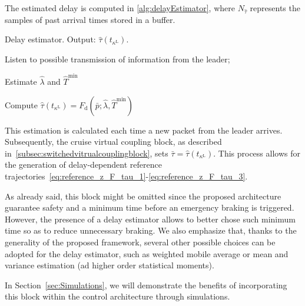 \documentclass[letterpaper, 10 pt, conference]{ieeeconf}
\theoremstyle{definition}
\theoremstyle{nopoint}
\newcommand{\tildeAdd}{~}
\begin{document}
The estimated delay is computed in \ref{alg:delayEstimator}, where $N_{\hat{\tau}}$ represents the samples of past arrival times stored in a buffer.

\begin{algorithm}
	\caption{Delay estimator. Output: $\hat{\tau}(t_{\kappa^\mathrm{L}})$. }\label{alg:delayEstimator}
	\begin{algorithmic}[1]
		\Loop
		
		\State Listen to possible transmission of information from the leader;
		
		
		\State Estimate $\hat{\lambda}$ and $\hat{T}^\mathrm{min}$
		
		\State Compute $\hat{\tau}(t_{\kappa^\mathrm{L}}) = F_{\mathrm{d}} (\bar{p}; \hat{\lambda}, \hat{T}^\mathrm{min})$
		
		\EndIf
		
		
		
		\EndLoop
		
	\end{algorithmic}
\end{algorithm}


This estimation is calculated each time a new packet from the leader arrives. Subsequently, the cruise virtual coupling block, as described in\tildeAdd\ref{subsec:switchedvitrualcouplingblock}, sets $\bar{\tau}=\hat{\tau}(t_{\kappa^\mathrm{L}})$. This process allows for the generation of delay-dependent reference trajectories\tildeAdd\eqref{eq:reference_z_F_tau_1}-\eqref{eq:reference_z_F_tau_3}.

As already said, this block might be omitted since the proposed architecture guarantee safety and a minimum time before an emergency braking is triggered. However, the presence of a delay estimator allows to better chose such minimum time so as to reduce unnecessary braking. 
We also emphasize that, thanks to the generality of the proposed framework, several other possible choices can be adopted for the delay estimator, such as weighted mobile average or mean and variance estimation (ad higher order statistical moments). 

In Section\tildeAdd\ref{sec:Simulations}, we will demonstrate the benefits of incorporating this block within the control architecture through simulations.
\end{document}
